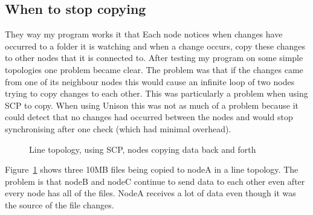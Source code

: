 \documentclass[12pt]{article}
\begin{document}
\subsection{When to stop copying}
They way my program works it that Each node notices when changes
have occurred to a folder it is watching and when a change occurs,
copy these changes to other nodes that it is connected to.
After testing my program on some simple topologies one problem became
clear. 
The problem was that if the changes
came from one of its neighbour nodes this would cause an infinite loop
of two nodes trying to copy changes to each other. This was particularly 
a problem when using SCP to copy. When using Unison this was not as much of
a problem because it could detect that no changes had occurred between the nodes
and would stop synchronising after one check (which had minimal overhead).

\begin{figure}[htp]
    \caption{Line topology, using SCP, nodes copying data back and forth}
    \label{fig:line_scp_back_forth_graph}
\end{figure}

Figure~\ref{fig:line_scp_back_forth_graph} shows three 10MB files being copied to nodeA
in a line topology. The problem is that nodeB and nodeC continue to send
data to each other even after every node has all of the files. NodeA receives
a lot of data even though it was the source of the file changes. 
\end{document}
